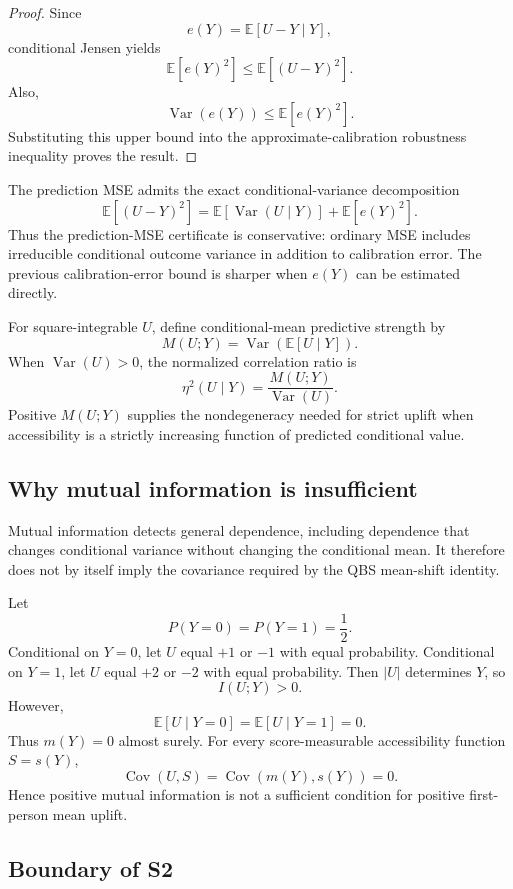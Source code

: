 \begin{proof}
Since
\[
e(Y)=\mathbb E[U-Y\mid Y],
\]
conditional Jensen yields
\[
\mathbb E[e(Y)^2]
\le
\mathbb E[(U-Y)^2].
\]
Also,
\[
\operatorname{Var}(e(Y))
\le
\mathbb E[e(Y)^2].
\]
Substituting this upper bound into the approximate-calibration robustness inequality proves the result.
\end{proof}

The prediction MSE admits the exact conditional-variance decomposition
\[
\mathbb E[(U-Y)^2]
=
\mathbb E[\operatorname{Var}(U\mid Y)]
+
\mathbb E[e(Y)^2].
\]
Thus the prediction-MSE certificate is conservative: ordinary MSE includes irreducible conditional outcome variance in addition to calibration error. The previous calibration-error bound is sharper when $e(Y)$ can be estimated directly.

For square-integrable $U$, define conditional-mean predictive strength by
\[
M(U;Y)
=
\operatorname{Var}(\mathbb E[U\mid Y]).
\]
When $\operatorname{Var}(U)>0$, the normalized correlation ratio is
\[
\eta^2(U\mid Y)
=
\frac{M(U;Y)}{\operatorname{Var}(U)}.
\]
Positive $M(U;Y)$ supplies the nondegeneracy needed for strict uplift when accessibility is a strictly increasing function of predicted conditional value.

\subsection{Why mutual information is insufficient}

Mutual information detects general dependence, including dependence that changes conditional variance without changing the conditional mean. It therefore does not by itself imply the covariance required by the QBS mean-shift identity.

Let
\[
P(Y=0)=P(Y=1)=\frac12.
\]
Conditional on $Y=0$, let $U$ equal $+1$ or $-1$ with equal probability. Conditional on $Y=1$, let $U$ equal $+2$ or $-2$ with equal probability. Then $|U|$ determines $Y$, so
\[
I(U;Y)>0.
\]
However,
\[
\mathbb E[U\mid Y=0]
=
\mathbb E[U\mid Y=1]
=0.
\]
Thus $m(Y)=0$ almost surely. For every score-measurable accessibility function $S=s(Y)$,
\[
\operatorname{Cov}(U,S)
=
\operatorname{Cov}(m(Y),s(Y))
=0.
\]
Hence positive mutual information is not a sufficient condition for positive first-person mean uplift.

\subsection{Boundary of S2}

